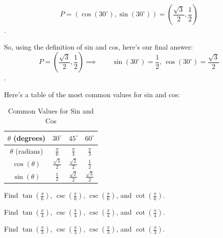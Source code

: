 \newpage

\[ P = (\cos (30^{\circ}), \sin (30^{\circ})) = \left(\frac{\sqrt{3}}{2}, \frac{1}{2}\right) \].

So, using the definition of sin and cos, here's our final answer:
\[ P = \left(\frac{\sqrt{3}}{2}, \frac{1}{2}\right) \implies\qquad\sin (30^{\circ}) = \frac{1}{2} \textrm{, } \cos (30^{\circ}) = \frac{\sqrt{3}}{2} \].

Here's a table of the most common values for sin and cos:

\begin{table}[htpb]
  \label{tab:common_values_for_sin_and_cos}
  \centering

  \begin{tabular}{|c|c|c|c|}
    \hline
    $\theta$ (degrees) & $30^{\circ}$ & $45^{\circ}$ & $60^{\circ}$ \\
    \hline
    $\theta$ (radians) & $\frac{\pi}{6}$ & $\frac{\pi}{4}$ & $\frac{\pi}{3}$ \\
    \hline
    $\cos (\theta)$ & $\frac{\sqrt{3}}{2}$ & $\frac{\sqrt{2}}{2}$ & $\frac{1}{2}$ \\
    \hline
    $\sin (\theta)$ & $\frac{1}{2}$ & $\frac{\sqrt{2}}{2}$ & $\frac{\sqrt{3}}{2}$ \\
    \hline
  \end{tabular}

  \caption{Common Values for Sin and Cos}
\end{table}

\begin{exc}
  \label{exc:find_tan_sec_csc_cot_1}

  Find $\tan \left(\frac{\pi}{6}\right)$, $\csc \left(\frac{\pi}{6}\right)$,
  $\csc \left(\frac{\pi}{6}\right)$, and $\cot \left(\frac{\pi}{6}\right)$.
\end{exc}

\begin{exc}
  \label{exc:find_tan_sec_csc_cot_2}

  Find $\tan \left(\frac{\pi}{4}\right)$, $\csc \left(\frac{\pi}{4}\right)$,
  $\csc \left(\frac{\pi}{4}\right)$, and $\cot \left(\frac{\pi}{4}\right)$.
\end{exc}

\begin{exc}
  \label{exc:find_tan_sec_csc_cot_3}

  Find $\tan \left(\frac{\pi}{3}\right)$, $\csc \left(\frac{\pi}{3}\right)$,
  $\csc \left(\frac{\pi}{3}\right)$, and $\cot \left(\frac{\pi}{3}\right)$.
\end{exc}

\newpage

